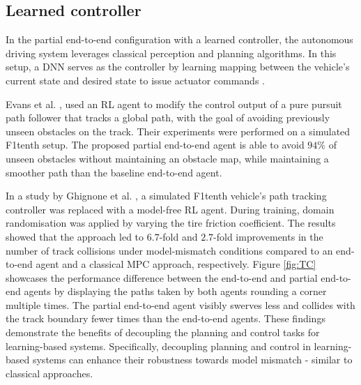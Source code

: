 \subsection{Learned controller}
\label{sec:learned_controller}
In the partial end-to-end configuration with a learned controller, 
the autonomous driving system leverages classical perception and planning algorithms. 
In this setup, a DNN serves as the controller by learning mapping between the vehicle's current state and desired state to issue actuator commands \cite{Betz2021}.

Evans et al. \cite{Evans2021b}, used an RL agent to modify the control output of a pure pursuit path follower that tracks a global path, with the goal of avoiding previously unseen obstacles on the track.
Their experiments were performed on a simulated F1tenth setup.
The proposed partial end-to-end agent is able to avoid $94\%$ of unseen obstacles without maintaining an obstacle map, while maintaining a smoother path than the baseline end-to-end agent.

In a study by Ghignone et al. \cite{Ghignone2022}, a simulated F1tenth vehicle's path tracking controller was replaced with a model-free RL agent. 
During training, domain randomisation was applied by varying the tire friction coefficient. 
The results showed that the approach led to $6.7$-fold and $2.7$-fold improvements in the number of track collisions under model-mismatch conditions compared to an end-to-end agent and a classical MPC approach, respectively. 
Figure \ref{fig:TC} showcases the performance difference between the end-to-end and partial end-to-end agents by displaying the paths taken by both agents rounding a corner multiple times.
The partial end-to-end agent visibly swerves less and collides with the track boundary fewer times than the end-to-end agents.
These findings demonstrate the benefits of decoupling the planning and control tasks for learning-based systems. 
Specifically, decoupling planning and control in learning-based systems can enhance their robustness towards model mismatch - similar to classical approaches.

